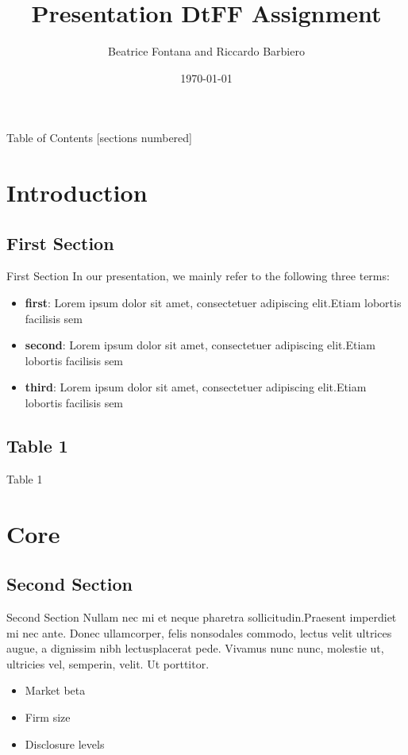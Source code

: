 \documentclass[10pt]{beamer}
\title{Presentation DtFF Assignment}\\
\date{\today}
\author{Beatrice Fontana and Riccardo Barbiero}
\institute{University of Zurich}
\begin{document}
\maketitle

\begin{frame}{Table of Contents}
  [sections numbered]
  \setcounter{tocdepth}{1}
  \tableofcontents%
\end{frame}

\section[Introduction]{Introduction}

\subsection{First Section}
\begin{frame}{First Section}
In our presentation, we mainly refer to the following three terms:
\begin{itemize}
    \item \textbf{first}: Lorem ipsum dolor sit amet, consectetuer adipiscing elit.Etiam lobortis facilisis sem
     \item \textbf{second}: Lorem ipsum dolor sit amet, consectetuer adipiscing elit.Etiam lobortis facilisis sem
    \item \textbf{third}: Lorem ipsum dolor sit amet, consectetuer adipiscing elit.Etiam lobortis facilisis sem
\end{itemize}
\end{frame}

\subsection{Table 1}
\begin{frame}{Table 1}
\end{frame}

\section[Core]{Core}
\subsection{Second Section}
\begin{frame}{Second Section}
Nullam nec mi et neque pharetra sollicitudin.Praesent imperdiet mi nec ante. Donec ullamcorper, felis nonsodales commodo, lectus velit ultrices augue, a dignissim nibh lectusplacerat pede. Vivamus nunc nunc, molestie ut, ultricies vel, semperin, velit. Ut porttitor.

 \begin{itemize}
     \item Market beta
     \item Firm size
     \item Disclosure levels
 \end{itemize}
\end{frame}
\end{document}
